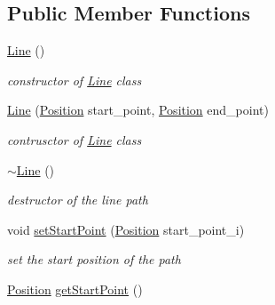 \subsection*{Public Member Functions}
\begin{DoxyCompactItemize}
\item 
\mbox{\label{class_path2_d_1_1_element_1_1_line_a994412817c823da52472fb49f58a00f7}} 
\mbox{\hyperlink{class_path2_d_1_1_element_1_1_line_a994412817c823da52472fb49f58a00f7}{Line}} ()
\begin{DoxyCompactList}\small\item\em constructor of \mbox{\hyperlink{class_path2_d_1_1_element_1_1_line}{Line}} class \end{DoxyCompactList}\item 
\mbox{\hyperlink{class_path2_d_1_1_element_1_1_line_a88244ad1861298c071c3f63b6726fad2}{Line}} (\mbox{\hyperlink{class_path2_d_1_1_element_1_1_position}{Position}} start\+\_\+point, \mbox{\hyperlink{class_path2_d_1_1_element_1_1_position}{Position}} end\+\_\+point)
\begin{DoxyCompactList}\small\item\em contrusctor of \mbox{\hyperlink{class_path2_d_1_1_element_1_1_line}{Line}} class \end{DoxyCompactList}\item 
\mbox{\label{class_path2_d_1_1_element_1_1_line_a82f0610f7a03d00f3560765b93cf9435}} 
\mbox{\hyperlink{class_path2_d_1_1_element_1_1_line_a82f0610f7a03d00f3560765b93cf9435}{$\sim$\+Line}} ()
\begin{DoxyCompactList}\small\item\em destructor of the line path \end{DoxyCompactList}\item 
void \mbox{\hyperlink{class_path2_d_1_1_element_1_1_line_a942a5789b98659054b06c2c1a99b9c4d}{set\+Start\+Point}} (\mbox{\hyperlink{class_path2_d_1_1_element_1_1_position}{Position}} start\+\_\+point\+\_\+i)
\begin{DoxyCompactList}\small\item\em set the start position of the path \end{DoxyCompactList}\item 
\mbox{\hyperlink{class_path2_d_1_1_element_1_1_position}{Position}} \mbox{\hyperlink{class_path2_d_1_1_element_1_1_line_a1170a26baad8c08c33b1eecbb0305810}{get\+Start\+Point}} ()

\end{DoxyCompactItemize}
